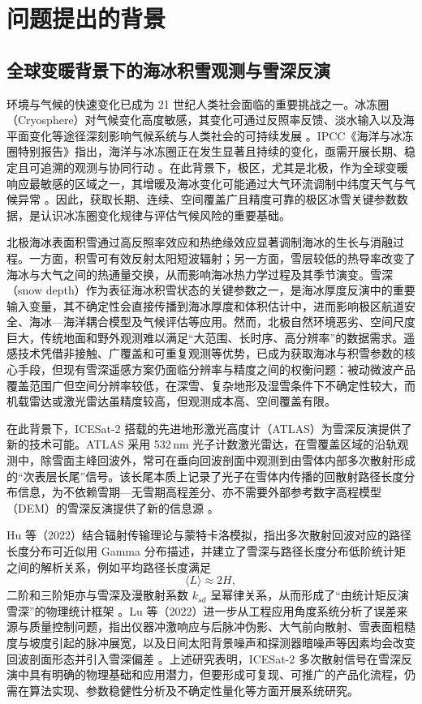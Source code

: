 \section{问题提出的背景}

\subsection{全球变暖背景下的海冰积雪观测与雪深反演}
\begin{sloppypar}
环境与气候的快速变化已成为 21 世纪人类社会面临的重要挑战之一。冰冻圈（Cryosphere）对气候变化高度敏感，其变化可通过反照率反馈、淡水输入以及海平面变化等途径深刻影响气候系统与人类社会的可持续发展 \cite{IPCC2019SROCC,Lenton2019}。IPCC《海洋与冰冻圈特别报告》指出，海洋与冰冻圈正在发生显著且持续的变化，亟需开展长期、稳定且可追溯的观测与协同行动 \cite{IPCC2019SROCC}。在此背景下，极区，尤其是北极，作为全球变暖响应最敏感的区域之一，其增暖及海冰变化可能通过大气环流调制中纬度天气与气候异常 \cite{Cohen2014}。因此，获取长期、连续、空间覆盖广且精度可靠的极区冰雪关键参数数据，是认识冰冻圈变化规律与评估气候风险的重要基础。
\end{sloppypar}

北极海冰表面积雪通过高反照率效应和热绝缘效应显著调制海冰的生长与消融过程。一方面，积雪可有效反射太阳短波辐射；另一方面，雪层较低的热导率改变了海冰与大气之间的热通量交换，从而影响海冰热力学过程及其季节演变。雪深（snow depth）作为表征海冰积雪状态的关键参数之一，是海冰厚度反演中的重要输入变量，其不确定性会直接传播到海冰厚度和体积估计中，进而影响极区航道安全、海冰—海洋耦合模型及气候评估等应用。然而，北极自然环境恶劣、空间尺度巨大，传统地面和野外观测难以满足“大范围、长时序、高分辨率”的数据需求。遥感技术凭借非接触、广覆盖和可重复观测等优势，已成为获取海冰与积雪参数的核心手段，但现有雪深遥感方案仍面临分辨率与精度之间的权衡问题：被动微波产品覆盖范围广但空间分辨率较低，在深雪、复杂地形及湿雪条件下不确定性较大，而机载雷达或激光雷达虽精度较高，但观测成本高、空间覆盖有限。

在此背景下，ICESat-2 搭载的先进地形激光高度计（ATLAS）为雪深反演提供了新的技术可能。ATLAS 采用 532\,nm 光子计数激光雷达，在雪覆盖区域的沿轨观测中，除雪面主峰回波外，常可在垂向回波剖面中观测到由雪体内部多次散射形成的“次表层长尾”信号。该长尾本质上记录了光子在雪体内传播的回散射路径长度分布信息，为不依赖雪期—无雪期高程差分、亦不需要外部参考数字高程模型（DEM）的雪深反演提供了新的信息源 \cite{Hu2022,Lu2022Unc}。

Hu 等（2022）结合辐射传输理论与蒙特卡洛模拟，指出多次散射回波对应的路径长度分布可近似用 Gamma 分布描述，并建立了雪深与路径长度分布低阶统计矩之间的解析关系，例如平均路径长度满足
\begin{equation}
  \langle L \rangle \approx 2H,
\end{equation}
二阶和三阶矩亦与雪深及漫散射系数 \(k_{sd}\) 呈幂律关系，从而形成了“由统计矩反演雪深”的物理统计框架 \cite{Hu2022}。Lu 等（2022）进一步从工程应用角度系统分析了误差来源与质量控制问题，指出仪器冲激响应与后脉冲伪影、大气前向散射、雪表面粗糙度与坡度引起的脉冲展宽，以及日间太阳背景噪声和探测器暗噪声等因素均会改变回波剖面形态并引入雪深偏差 \cite{Lu2022Unc}。上述研究表明，ICESat-2 多次散射信号在雪深反演中具有明确的物理基础和应用潜力，但要形成可复现、可推广的产品化流程，仍需在算法实现、参数稳健性分析及不确定性量化等方面开展系统研究。



